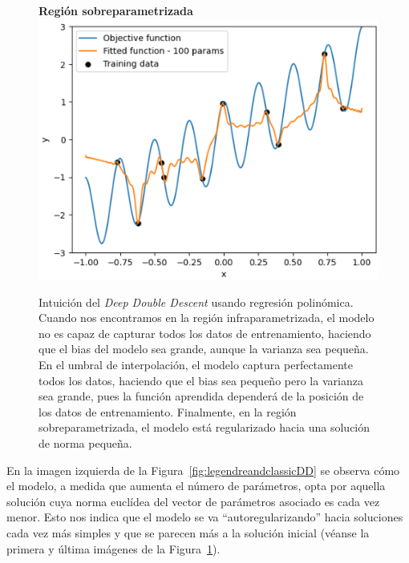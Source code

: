 \begin{figure}[h]
    \begin{minipage}{0.32\textwidth}
        \centering
        \textbf{Región sobreparametrizada} \\[0.5ex] 
        \includegraphics[width=\linewidth]{img/experiments/legendre1.3.png}
    \end{minipage}
    \caption[Intuición del \textit{Deep Double Descent} usando regresión polinómica.]{Intuición del \textit{Deep Double Descent} usando regresión polinómica. Cuando nos encontramos en la región infraparametrizada, el modelo no es capaz de capturar todos los datos de entrenamiento, haciendo que el bias del modelo sea grande, aunque la varianza sea pequeña. En el umbral de interpolación, el modelo captura perfectamente todos los datos, haciendo que el bias sea pequeño pero la varianza sea grande, pues la función aprendida dependerá de la posición de los datos de entrenamiento. Finalmente, en la región sobreparametrizada, el modelo está regularizado hacia una solución de norma pequeña.}\label{fig:legendre1DD}
\end{figure}

En la imagen izquierda de la Figura~\ref{fig:legendreandclassicDD} se observa cómo el modelo, a medida que aumenta el número de parámetros, opta por aquella solución cuya norma euclídea del vector de parámetros asociado es cada vez menor. Esto nos indica que el modelo se va ``autoregularizando'' hacia soluciones cada vez más simples y que se parecen más a la solución inicial (véanse la primera y última imágenes de la Figura~\ref{fig:legendre1DD}).\newline

